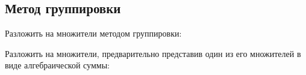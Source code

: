 \subsection*{Метод группировки}
\begin{enumcols}[label=\arabf]
	\item Разложить на множители методом группировки:
	\begin{enumcols}[columns=2]
		\item {}
		\item {}
		\item {}
		\item {}
		\item {}
		\item {}
	\end{enumcols}
	\item Разложить на множители, предварительно представив один из его множителей в виде алгебраической суммы:
	\begin{enumcols}[columns=2]
		\item {}
		\item {}
		\item {}
		\item {}
		\item {}
		\item {}
	\end{enumcols}
\end{enumcols}
